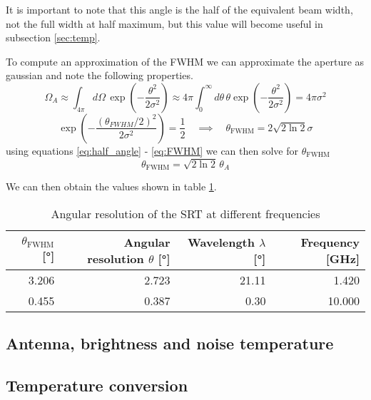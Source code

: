 It is important to note that this angle is the half of the equivalent beam width, not the full width at half maximum, but this value will become useful in subsection \ref{sec:temp}.

To compute an approximation of the FWHM we can approximate the aperture as gaussian \cite[p. 2]{script} and note the following properties.
\begin{equation}
    \Omega_A \approx \int_{4\pi } d\Omega\, \exp{\left( -\frac{\theta^2}{2\sigma^2} \right)} \approx 4\pi \int_0^{\infty} d\theta \, \theta \exp{\left( -\frac{\theta^2}{2\sigma^2} \right)} = 4\pi \sigma^2
    \label{eq:gauss_integral}
\end{equation}
\begin{equation}
    \exp{\left( -\frac{(\theta_{FWHM}/2)^2}{2\sigma^2}\right)} = \frac{1}{2} \quad \implies \quad \theta_{\text{FWHM}} = 2 \sqrt{2\ln{2}} \sigma \label{eq:FWHM}
\end{equation}
using equations \eqref{eq:half_angle} - \eqref{eq:FWHM} we can then solve for $\theta_{\text{FWHM}}$
\begin{equation}
    \theta_{\text{FWHM}} = \sqrt{2\ln{2}} \, \theta_A
\end{equation}

We can then obtain the values shown in table \ref{tab:ang_res}.
\begin{table}[H]
    \centering
    \begin{tabular}{rrrr}
        \toprule
        $\theta_{\text{FWHM}}$ [\si{\degree}] & Angular resolution $\theta$ [\si{\degree}] & Wavelength $\lambda$ [\si{\degree}] & Frequency [\si{\giga \hertz}]\\
        \midrule
        \num{3.206} &\num{2.723} & \num{21.11} & \num{1.420}\\
        \num{0.455} &\num{0.387} & \num{0.30} & \num{10.000}\\
        \bottomrule
    \end{tabular}
    \caption{Angular resolution of the SRT at different frequencies}
    \label{tab:ang_res}
\end{table}
\subsection{Antenna, brightness and noise temperature}

\subsection{Temperature conversion}


